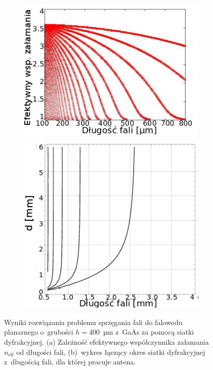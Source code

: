 \begin{figure}
\begin{subfigure}{0.5\textwidth}
        \includegraphics[width=\textwidth]{images/thz/gaas-neffeps.png}
	\caption{}
	\label{fig:gaas-effn}
\end{subfigure}
\begin{subfigure}{0.5\textwidth}
        \includegraphics[width=\textwidth]{images/antenaThz/d_lambda.png}
	\caption{}
	\label{fig:d-lusok}
\end{subfigure}
\caption{Wyniki rozwiązania problemu sprzęgania fali do falowodu planarnego o~grubości $h=$400~µm z~GaAs za pomocą siatki dyfrakcyjnej.  (a) Zależność efektywnego współczynnika załamania $n_{\textrm{eff}}$ od długości fali, (b)~wykres łączący okres siatki dyfrakcyjnej z~długością fali, dla której pracuje antena. }
\end{figure}

